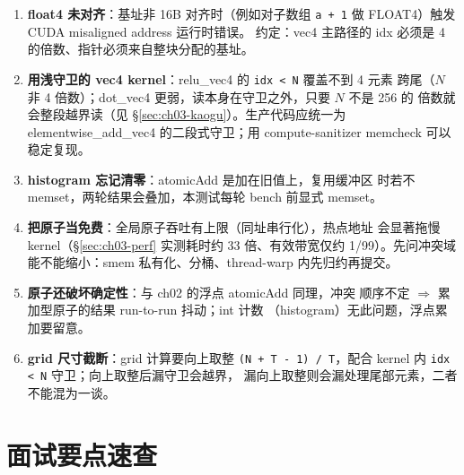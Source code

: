 \begin{enumerate}
\item \textbf{float4 未对齐}：基址非 16B 对齐时（例如对子数组
  \texttt{a + 1} 做 FLOAT4）触发 CUDA misaligned address 运行时错误。
  约定：vec4 主路径的 idx 必须是 4 的倍数、指针必须来自整块分配的基址。
\item \textbf{用浅守卫的 vec4 kernel}：relu\_vec4 的 \texttt{idx < N} 覆盖不到 4 元素
  跨尾（$N$ 非 4 倍数）；dot\_vec4 更弱，读本身在守卫之外，只要 $N$ 不是 256 的
  倍数就会整段越界读（见 \S\ref{sec:ch03-kaogu}）。生产代码应统一为
  elementwise\_add\_vec4 的二段式守卫；用 compute-sanitizer memcheck 可以稳定复现。
\item \textbf{histogram 忘记清零}：atomicAdd 是加在旧值上，复用缓冲区
  时若不 memset，两轮结果会叠加，本测试每轮 bench 前显式 memset。
\item \textbf{把原子当免费}：全局原子吞吐有上限（同址串行化），热点地址
  会显著拖慢 kernel（\S\ref{sec:ch03-perf} 实测耗时约 33 倍、有效带宽仅约 1/99）。先问冲突域
  能不能缩小：smem 私有化、分桶、thread-warp 内先归约再提交。
\item \textbf{原子还破坏确定性}：与 ch02 的浮点 atomicAdd 同理，冲突
  顺序不定 $\Rightarrow$ 累加型原子的结果 run-to-run 抖动；int 计数
  （histogram）无此问题，浮点累加要留意。
\item \textbf{grid 尺寸截断}：grid 计算要向上取整
  \texttt{(N + T - 1) / T}，配合 kernel 内 \texttt{idx < N} 守卫；向上取整后漏守卫会越界，
  漏向上取整则会漏处理尾部元素，二者不能混为一谈。
\end{enumerate}

\section{面试要点速查}

